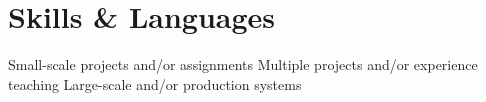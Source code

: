 \documentclass[10pt]{article}
\begin{document}
\section{Skills \& Languages}
\vspace{-1em}
\begin{multicols}{4}
\raggedcolumns
\begin{itemize}
\renewcommand{\labelitemi}{}
\renewcommand{\skill}{\textnormal}
\setlength{\itemsep}{1pt}
\setlength{\parskip}{0pt}
\setlength{\parsep}{0pt}

\skills{\bash}{\threeskill}
\skills{\ccpp}{\threeskill}
\skills{\cascalog}{\oneskill}
\skills{\clojure}{\threeskill}
\skills{\git}{\twoskill}
\skills{\hadoop}{\twoskill}
\skills{\haskell}{\oneskill}
\skills{\java}{\threeskill}
\skills{\js}{\twoskill}
\skills{\LaTeX}{\twoskill}
\skills{\matlab}{\threeskill}
\skills{\numpy/\scipy}{\threeskill}
\skills{\opencv}{\threeskill}
\skills{\python}{\threeskill}
\skills{\django}{\twoskill}
\skills{\scheme}{\threeskill}
\skills{\sql}{\twoskill}

\end{itemize}
\end{multicols}


\begin{footnotesize}
  \oneskill Small-scale projects and/or assignments \hfill
  \twoskill Multiple projects and/or experience teaching \hfill
  \threeskill Large-scale and/or production systems
\end{footnotesize}

\newcommand{\proj}[3]{
  \textsc{#1} & #2\\
   &\href{http://www.#3}{#3}\\
   \multicolumn{2}{c}{} \\ [-1ex]
}

\newcommand{\projl}[3]{
  \textsc{#1} & #2\\
   &\href{http://www.#3}{#3}\\
}
\end{document}
